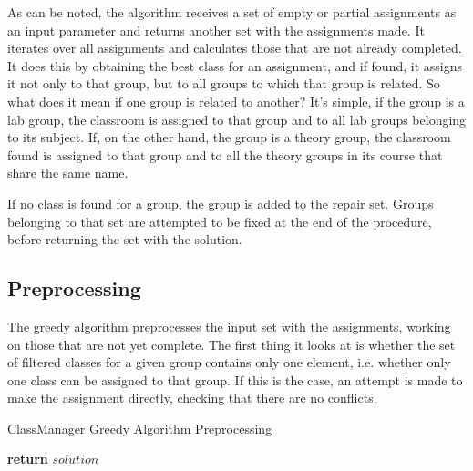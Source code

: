 As can be noted, the algorithm receives a set of empty or partial assignments as an input parameter and returns another set with the assignments made. It iterates over all assignments and calculates those that are not already completed. It does this by obtaining the best class for an assignment, and if found, it assigns it not only to that group, but to all groups to which that group is related. So what does it mean if one group is related to another? It's simple, if the group is a lab group, the classroom is assigned to that group and to all lab groups belonging to its subject. If, on the other hand, the group is a theory group, the classroom found is assigned to that group and to all the theory groups in its course that share the same name.

If no class is found for a group, the group is added to the repair set. Groups belonging to that set are attempted to be fixed at the end of the procedure, before returning the set with the solution.


\subsection{Preprocessing}

The greedy algorithm preprocesses the input set with the assignments, working on those that are not yet complete. The first thing it looks at is whether the set of filtered classes for a given group contains only one element, i.e. whether only one class can be assigned to that group. If this is the case, an attempt is made to make the assignment directly, checking that there are no conflicts.

\begin{algorithm}[H]
    \caption{ClassManager Greedy Algorithm Preprocessing}
    \begin{algorithmic}[1]
                        \EndIf
                    \EndIf
                \EndIf
            \EndFor
            \State \textbf{return} $solution$
        \EndProcedure
    \end{algorithmic}
\end{algorithm}

